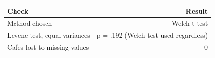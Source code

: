 \begin{tabular}{lr}
\toprule
Check & Result \\
\midrule
Method chosen & Welch t-test \\
Levene test, equal variances & p = .192 (Welch test used regardless) \\
Cafes lost to missing values & 0 \\
\bottomrule
\end{tabular}
